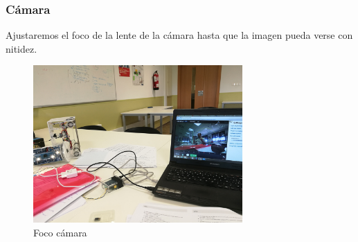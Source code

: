   \subsubsection{Cámara}
  \label{subsubsec:camara}
Ajustaremos el foco de la lente de la cámara hasta que la imagen pueda verse con nitidez.
\begin{figure} [hbtp]
\begin{center}
  \includegraphics[width=8cm]{img/cap3/3_4/foco}
\end{center}
\caption{Foco cámara}
\label{fig:foco}
\end{figure}
    
